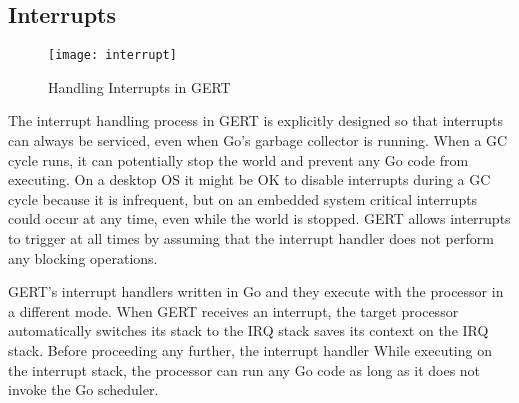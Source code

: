 


\subsection{Interrupts}
\begin{figure}[h]
\begin{center}
  \texttt{[image: interrupt]}
\end{center}
  \caption{Handling Interrupts in GERT} \label{fig:interrupt}
\end{figure}

The interrupt handling process in GERT is explicitly designed so
that interrupts can always be serviced, even when Go's garbage collector
is running. When a GC cycle runs, it can potentially stop the world and
prevent any Go code from executing. On a desktop OS it might be OK to disable
interrupts during a GC cycle because it is infrequent, but on an embedded system
critical interrupts could occur at any time, even while the world is
stopped. GERT allows interrupts to trigger at all times by assuming that the
interrupt handler does not perform any blocking operations.



GERT's interrupt handlers written in Go and they execute with the processor
in a different mode. When GERT receives an interrupt, the target processor
automatically switches its stack to the IRQ stack saves its context on the IRQ stack.
Before proceeding any further, the interrupt handler 
While executing on the interrupt stack, the processor can run any Go code
as long as it does not invoke the Go scheduler. 

